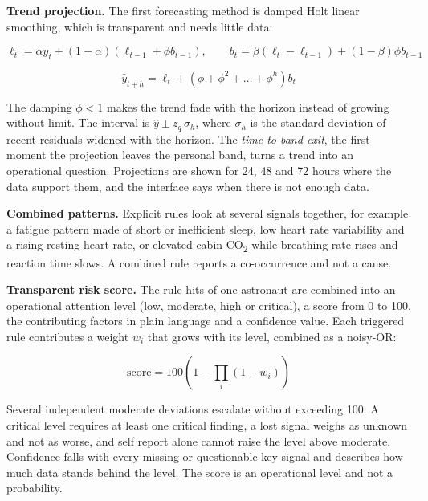 \medskip\noindent\textbf{Trend projection.} The first forecasting method is damped Holt linear smoothing, which is transparent and needs little data:

\begin{equation}
\ell_t=\alpha y_t+(1-\alpha)\left(\ell_{t-1}+\phi b_{t-1}\right),\qquad
b_t=\beta\left(\ell_t-\ell_{t-1}\right)+(1-\beta)\phi b_{t-1}
\end{equation}

\begin{equation}
\hat{y}_{t+h}=\ell_t+\left(\phi+\phi^2+\dots+\phi^h\right)b_t
\end{equation}

The damping $\phi<1$ makes the trend fade with the horizon instead of growing without limit. The interval is $\hat{y}\pm z_{q}\,\sigma_h$, where $\sigma_h$ is the standard deviation of recent residuals widened with the horizon. The \textit{time to band exit}, the first moment the projection leaves the personal band, turns a trend into an operational question. Projections are shown for 24, 48 and 72 hours where the data support them, and the interface says when there is not enough data.

\medskip\noindent\textbf{Combined patterns.} Explicit rules look at several signals together, for example a fatigue pattern made of short or inefficient sleep, low heart rate variability and a rising resting heart rate, or elevated cabin CO\textsubscript{2} while breathing rate rises and reaction time slows. A combined rule reports a co-occurrence and not a cause.

\medskip\noindent\textbf{Transparent risk score.} The rule hits of one astronaut are combined into an operational attention level (low, moderate, high or critical), a score from 0 to 100, the contributing factors in plain language and a confidence value. Each triggered rule contributes a weight $w_i$ that grows with its level, combined as a noisy-OR:

\begin{equation}
\text{score}=100\left(1-\prod_i\left(1-w_i\right)\right)
\end{equation}

Several independent moderate deviations escalate without exceeding 100. A critical level requires at least one critical finding, a lost signal weighs as unknown and not as worse, and self report alone cannot raise the level above moderate. Confidence falls with every missing or questionable key signal and describes how much data stands behind the level. The score is an operational level and not a probability.

